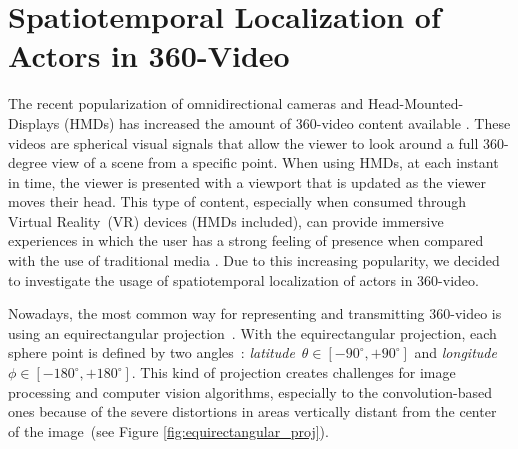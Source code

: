 \section{Spatiotemporal Localization of Actors in 360-Video}

The recent popularization of omnidirectional cameras and Head-Mounted-Displays (HMDs) has increased the amount of 360-video content available \cite{mendes2020authoring}. These videos are spherical visual signals that allow the viewer to look around a full 360-degree view of a scene from a specific point. When using HMDs, at each instant in time, the viewer is presented with a viewport that is updated as the viewer moves their head. This type of content, especially when consumed through Virtual Reality~(VR) devices (HMDs included), can provide immersive experiences in which the user has a strong feeling of presence when compared with the use of traditional media \cite{montagud_culture_2020}. Due to this increasing popularity, we decided to investigate the usage of spatiotemporal localization of actors in 360-video.

Nowadays, the most common way for representing and transmitting 360-video is using an equirectangular projection~\cite{yang2018object}. With the equirectangular projection, each sphere point is defined by two angles~\cite{snyder1987map}: \emph{latitude}~$\theta \in [-90^{\circ}, +90^{\circ}]$ and \emph{longitude}~$\phi \in [-180^{\circ}, +180^{\circ}]$. This kind of projection creates challenges for image processing and computer vision algorithms, especially to the convolution-based ones because of the severe distortions in areas vertically distant from the center of the image~(see Figure \ref{fig:equirectangular_proj}).

